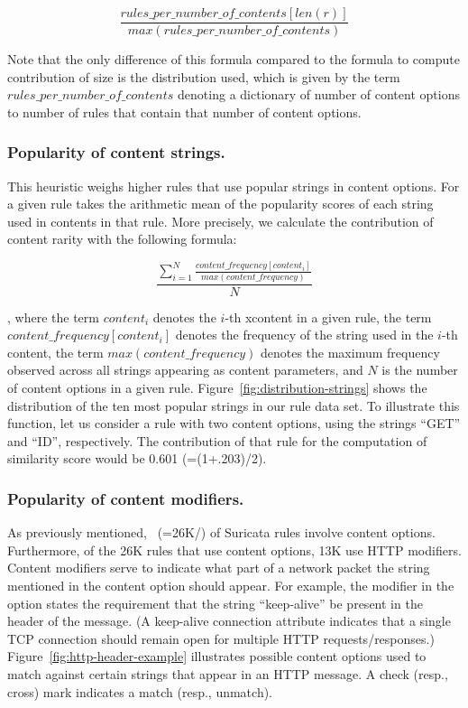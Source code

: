 \documentclass[sigconf,review, anonymous]{acmart}
\begin{document}
\[\frac{\mathit{rules\_per\_number\_of\_contents[len(r)]}}{\mathit{max(rules\_per\_number\_of\_contents)}}\]

\noindent
Note that the only difference of this formula compared to the formula
to compute contribution of size is the distribution used, which is
given by the term $\mathit{rules\_per\_number\_of\_contents}$ denoting
a dictionary of number of content options to number of rules that
contain that number of content options.

\subsubsection{Popularity of content strings.} 
This heuristic weighs higher rules that use popular strings in content
options. For a given rule \tname{} takes the arithmetic mean of the
popularity scores of each string used in contents in that rule. More
precisely, we calculate the contribution of content rarity with the
following formula:

\[\frac{\sum_{i=1}^{N}\frac{\mathit{content\_frequency[content_i]}}{\mathit{max(content\_frequency)}}}{N}\]

\noindent
, where the term $\mathit{content_i}$ denotes the $i$-th xcontent in a
given rule, the term $\mathit{content\_frequency[\mathit{content_i}]}$
denotes the frequency of the string used in the $i$-th content, the
term $\mathit{max(content\_frequency)}$ denotes the maximum frequency
observed across all strings appearing as content parameters, and $N$
is the number of content options in a given
rule. Figure~\ref{fig:distribution-strings} shows the distribution of
the ten most popular strings in our rule data set. To illustrate this
function, let us consider a rule with two content options, using the
strings ``GET'' and ``ID'', respectively. The contribution of that
rule for the computation of similarity score would be 0.601
(=(1+.203)/2).



\subsubsection{Popularity of content modifiers.} As previously
mentioned, \percRulesWithContent\ (=26K/\numrulessuri) of Suricata
rules involve content options. Furthermore, of the 26K rules that use
content options, 13K use HTTP modifiers.  Content modifiers
serve to indicate what part of a network packet the string mentioned
in the content option should appear. For example, the modifier
 in the option  states the requirement that the string ``keep-alive''
be present in the header of the message. (A keep-alive connection
attribute indicates that a single TCP connection should remain open
for multiple HTTP requests/responses.)
Figure~\ref{fig:http-header-example} illustrates possible content
options used to match against certain strings that appear in an HTTP
message. A check (resp., cross) mark indicates a match (resp.,
unmatch).
\end{document}
